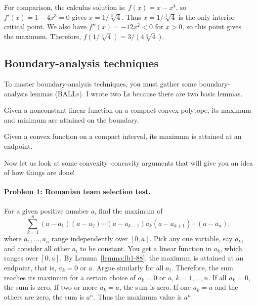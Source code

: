 \documentclass[11pt,a4paper]{article}
\begin{document}
For comparison, the calculus solution is:
$f(x)=x-x^4$, so $f'(x)=1-4x^3=0$ gives $x=1/\sqrt[3]4$.
Thus $x=1/\sqrt[3]4$ is the only interior critical point.
We also have $f''(x)=-12x^2<0$ for $x>0$, so this point gives the maximum.
Therefore, $f(1/\sqrt[3]4)=3/(4\sqrt[3]4)$.



\subsection{Boundary-analysis techniques}
To master boundary-analysis techniques, you must gather some
boundary-analysis lemmas (BALLs). I wrote two Ls because there are two
basic lemmas.
\setcounter{theorem}{85}\begin{lemma}\label{lemma:lb1-88}
Given a nonconstant linear function on a compact convex polytope, its maximum
and minimum are attained on the boundary.
\end{lemma}
\setcounter{theorem}{86}\begin{lemma}\label{lemma:lb1-89}
Given a convex function on a compact interval, its maximum is attained at an endpoint.
\end{lemma}
Now let us look at some convexity--concavity arguments that will give you
an idea of how things are done!
\paragraph{Problem 1: Romanian team selection test.}
For a given positive number $a$, find the maximum of
\[\sum_{k=1}^n(a-a_1)(a-a_2)\cdots(a-a_{k-1})a_k(a-a_{k+1})\cdots(a-a_n),\]
where $a_1,\ldots,a_n$ range independently over $[0,a]$.
Pick any one variable, say $a_k$, and consider all other $a_i$ to be constant.
You get a linear function in $a_k$, which ranges over $[0,a]$.
By Lemma~\ref{lemma:lb1-88}, the maximum is attained at an endpoint, that is, $a_k=0$ or $a$.
Argue similarly for all $a_i$. Therefore, the sum reaches its maximum for a certain choice of $a_k=0$ or $a$, $k=1,\ldots,n$.
If all $a_k=0$, the sum is zero. If two or more $a_k=a$, the sum is zero.
If one $a_k=a$ and the others are zero, the sum is $a^n$.
Thus the maximum value is $a^n$.
\end{document}
